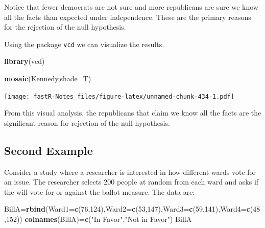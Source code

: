 \documentclass[]{book}
\newenvironment{Shaded}{\begin{snugshade}}{\end{snugshade}}
\newcommand{\KeywordTok}[1]{\textcolor[rgb]{0.13,0.29,0.53}{\textbf{#1}}}
\newcommand{\DataTypeTok}[1]{\textcolor[rgb]{0.13,0.29,0.53}{#1}}
\newcommand{\DecValTok}[1]{\textcolor[rgb]{0.00,0.00,0.81}{#1}}
\newcommand{\StringTok}[1]{\textcolor[rgb]{0.31,0.60,0.02}{#1}}
\newcommand{\NormalTok}[1]{#1}
\theoremstyle{definition}
\theoremstyle{definition}
\theoremstyle{definition}
\theoremstyle{remark}
\begin{document}
Notice that fewer democrats are not sure and more republicans are sure
we know all the facts than expected under independence. These are the
primary reasons for the rejection of the null hypothesis.

Using the package \texttt{vcd} we can visualize the results.

\begin{Shaded}
\begin{Highlighting}[]
\KeywordTok{library}\NormalTok{(vcd)}
\end{Highlighting}
\end{Shaded}

\begin{Shaded}
\begin{Highlighting}[]
\KeywordTok{mosaic}\NormalTok{(Kennedy,}\DataTypeTok{shade=}\NormalTok{T)}
\end{Highlighting}
\end{Shaded}

\texttt{[image: fastR-Notes\_files/figure-latex/unnamed-chunk-434-1.pdf]}

From this visual analysis, the republicans that claim we know all the
facts are the significant reason for rejection of the null hypothesis.

\subsection{Second Example}\label{second-example}

Consider a study where a researcher is interested in how different wards
vote for an issue. The researcher selects 200 people at random from each
ward and asks if the will vote for or against the ballot measure. The
data are:

\begin{Shaded}
\begin{Highlighting}[]
\NormalTok{BillA=}\KeywordTok{rbind}\NormalTok{(}\DataTypeTok{Ward1=}\KeywordTok{c}\NormalTok{(}\DecValTok{76}\NormalTok{,}\DecValTok{124}\NormalTok{),}\DataTypeTok{Ward2=}\KeywordTok{c}\NormalTok{(}\DecValTok{53}\NormalTok{,}\DecValTok{147}\NormalTok{),}\DataTypeTok{Ward3=}\KeywordTok{c}\NormalTok{(}\DecValTok{59}\NormalTok{,}\DecValTok{141}\NormalTok{),}\DataTypeTok{Ward4=}\KeywordTok{c}\NormalTok{(}\DecValTok{48}\NormalTok{,}\DecValTok{152}\NormalTok{))}
\KeywordTok{colnames}\NormalTok{(BillA)=}\KeywordTok{c}\NormalTok{(}\StringTok{"In Favor"}\NormalTok{,}\StringTok{"Not in Favor"}\NormalTok{)}
\NormalTok{BillA}
\end{Highlighting}
\end{Shaded}
\end{document}
